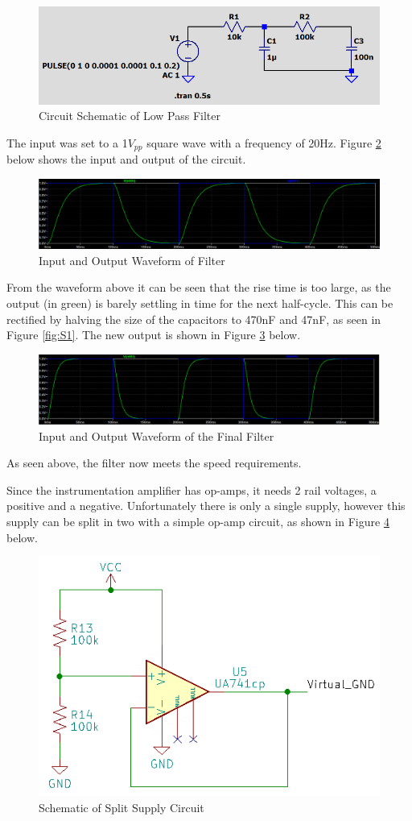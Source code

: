 \documentclass[class=report,11pt,crop=false]{standalone}
\begin{document}
	\begin{figure}[h!]
		\centering
		\includegraphics[width=0.5\linewidth]{Figures/Filter.png}
		\caption{Circuit Schematic of Low Pass Filter}
		\label{fig:S2}
	\end{figure}
	
	The input was set to a 1$V_{pp}$ square wave with a frequency of 20Hz. Figure \ref{fig:S3} below shows the input and output of the circuit.
	
	\begin{figure}[h!]
		\centering
		\includegraphics[width=0.9\linewidth]{Figures/Filter Waveform.png}
		\caption{Input and Output Waveform of Filter}
		\label{fig:S3}
	\end{figure}
	
	From the waveform above it can be seen that the rise time is too large, as the output (in green) is barely settling in time for the next half-cycle. This can be rectified by halving the size of the capacitors to 470nF and 47nF, as seen in Figure \ref{fig:S1}. The new output is shown in Figure \ref{fig:S4} below.
	
	\begin{figure}[h!]
		\centering
		\includegraphics[width=0.9\linewidth]{Figures/Filter Waveform2.png}
		\caption{Input and Output Waveform of the Final Filter}
		\label{fig:S4}
	\end{figure}
	As seen above, the filter now meets the speed requirements.
	
	Since the instrumentation amplifier has op-amps, it needs 2 rail voltages, a positive and a negative. Unfortunately there is only a single supply, however this supply can be split in two with a simple op-amp circuit, as shown in Figure \ref{fig:S5} below.
	\begin{figure}[h!]
		\centering
		\includegraphics[width=0.5\linewidth]{Figures/Split Supply.png}
		\caption{Schematic of Split Supply Circuit}
		\label{fig:S5}
	\end{figure}
	
\end{document}
